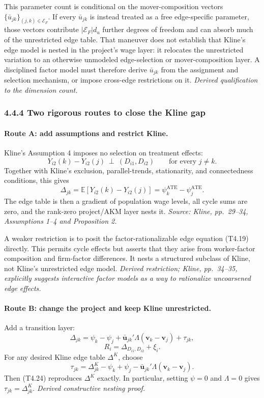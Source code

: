 \documentclass[11pt]{article}
\begin{document}
This parameter count is conditional on the mover-composition vectors
\(\{\bar u_{jk}\}_{(j,k)\in\mathcal E_F}\).  If every \(\bar u_{jk}\) is instead
treated as a free edge-specific parameter, those vectors contribute
\(|\mathcal E_F|d_u\) further degrees of freedom and can absorb much of the
unrestricted edge table.  That maneuver does not establish that Kline's edge
model is nested in the project's wage layer: it relocates the unrestricted
variation to an otherwise unmodeled edge-selection or mover-composition layer.
A disciplined factor model must therefore derive \(\bar u_{jk}\) from the
assignment and selection mechanism, or impose cross-edge restrictions on it.
\textit{Derived qualification to the dimension count.}

\subsubsection{4.4.4 Two rigorous routes to close the Kline gap}

\paragraph{Route A: add assumptions and restrict Kline.}
Kline's Assumption 4 imposes no selection on treatment effects:
\[
Y_{i2}(k)-Y_{i2}(j)
\ \perp\
(D_{i1},D_{i2})
\qquad
\text{for every }j\neq k.
\tag{T4.22}
\]
Together with Kline's exclusion, parallel-trends, stationarity, and
connectedness conditions, this gives
\[
\Delta_{jk}
=
\mathbb E[Y_{i2}(k)-Y_{i2}(j)]
=
\psi_k^{\mathrm{ATE}}-\psi_j^{\mathrm{ATE}}.
\tag{T4.23}
\]
The edge table is then a gradient of population wage levels, all cycle sums
are zero, and the rank-zero project/AKM layer nests it.
\textit{Source: Kline, pp.\ 29--34, Assumptions 1--4 and Proposition 2.}

A weaker restriction is to posit the factor-rationalizable edge equation
(T4.19) directly.  This permits cycle effects but asserts that they arise from
worker-factor composition and firm-factor differences.  It nests a structured
subclass of Kline, not Kline's unrestricted edge model.
\textit{Derived restriction; Kline, pp.\ 34--35, explicitly suggests
interactive factor models as a way to rationalize uncoarsened edge effects.}

\paragraph{Route B: change the project and keep Kline unrestricted.}
Add a transition layer:
\[
\Delta_{jk}
=
\psi_k-\psi_j
+\bar{\mathbf u}_{jk}'\Lambda(\mathbf v_k-\mathbf v_j)
+\tau_{jk},
\tag{T4.24}
\]
\[
R_i
=
\Delta_{D_{i1},D_{i2}}+\xi_i.
\tag{T4.25}
\]
For any desired Kline edge table \(\Delta^K\), choose
\[
\tau_{jk}
=
\Delta^K_{jk}
-\psi_k+\psi_j
-\bar{\mathbf u}_{jk}'\Lambda(\mathbf v_k-\mathbf v_j).
\tag{T4.26}
\]
Then (T4.24) reproduces \(\Delta^K\) exactly.  In particular, setting
\(\psi=0\) and \(\Lambda=0\) gives \(\tau_{jk}=\Delta^K_{jk}\).
\textit{Derived constructive nesting proof.}
\end{document}
